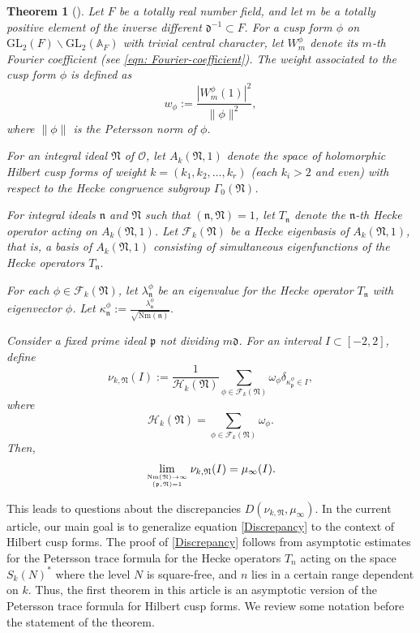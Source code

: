 \documentclass[reqno]{amsart}
\theoremstyle{plain}
\newtheorem*{unmthm}{Theorem}
\theoremstyle{definition}
\theoremstyle{remark}
\def\GL{\mathrm{GL}}
\def\Nr{\mathrm{Nm}}
\def\A{\mathbbm A}
\def\A{\mathbb A}
\begin{document}
\begin{unmthm}[\cite{KL}]
Let $F$ be a totally real number field, and let $m$ be a totally positive element of the inverse different $\mathfrak{d}^{-1}\subset F.$  For a cusp form $\phi $ on $\GL_2(F) \backslash \GL_2({\A}_F)$ with trivial central character, let $W_m^\phi $ denote its $m$-th Fourier coefficient (see \eqref{eqn: Fourier-coefficient}). The weight associated to the cusp form $\phi$ is defined as
$$
w_\phi:=\frac{|W_m^\phi(1)|^2}{\| \phi\|^2},
$$
where $\| \phi\|$ is the Petersson norm of $\phi$.
 
For an integral ideal $\mathfrak{N}$ of $\mathcal{O}$, let $A_k(\mathfrak{N},1)$ denote the space of holomorphic Hilbert cusp forms of weight $ k = (k_1,k_2,\dots,k_r)$ (each $k_i >2$ and even) with respect to the Hecke congruence subgroup $\Gamma_0(\mathfrak{N})$.  

 For integral ideals $\mathfrak{n}$ and $\mathfrak{N}$ such that $(\mathfrak{n},\mathfrak{N}) = 1$, let $T_\mathfrak{n}$ denote the $\mathfrak{n}$-th Hecke operator acting on $A_k(\mathfrak{N},1)$.  Let $\mathcal F_k(\mathfrak{N})$ be a Hecke eigenbasis of $A_k(\mathfrak{N},1)$, that is, a basis of $A_k(\mathfrak{N},1)$ consisting of simultaneous eigenfunctions of the Hecke operators $T_\mathfrak{n}.\,$
 
For each $\phi \in \mathcal F_k(\mathfrak{N})$, let $\lambda^\phi_{\mathfrak{n}}$ be an eigenvalue for the Hecke operator $T_{\mathfrak{n}}$ with eigenvector $\phi$.  Let $\kappa^\phi_{\mathfrak{n}}:=\frac{\lambda^\phi_{\mathfrak{n}}}{\sqrt{\Nr(\mathfrak{n})}}.$
 
Consider a fixed prime ideal $\mathfrak{p}$ not dividing $m\mathfrak{d}$.  For an interval $I \subset [-2,2]$, define
\begin{equation}\label{nu-HF-1}
{\nu}_{k,\mathfrak{N}}(I) := \frac{1}{\mathcal H_k(\mathfrak{N})}\sum_{\phi \in \mathcal F_k(\mathfrak{N})}\omega_{\phi}\delta_{\kappa^\phi_{\mathfrak{p}} \in I},
\end{equation}
where
$$\mathcal H_k(\mathfrak{N}) = \sum_{\phi \in \mathcal F_k(\mathfrak{N})}\omega_{\phi}.$$
Then,
$$
\lim_{\Nr(\mathfrak{N})\rightarrow \infty \atop {(\mathfrak{p}, \mathfrak{N}) = 1}} {\nu}_{k,\mathfrak{N}}(I) = \mu_{\infty}(I).
$$
\end{unmthm}

This leads to questions about the discrepancies $D(\nu_{k,\mathfrak{N}},\mu_{\infty})$.  In the current article,  our main goal is to generalize equation \eqref{Discrepancy} to the context of  Hilbert cusp forms. The proof of  \eqref{Discrepancy} follows from asymptotic estimates for the Petersson trace formula for the Hecke operators $T_n$ acting on the space $S_k(N)^*$ where the level $N$ is square-free, and $n$ lies in a certain range dependent on $k$.  Thus, the first theorem in this article is an asymptotic version of the Petersson trace formula for Hilbert cusp forms.  We review some notation before the statement of the theorem.
\end{document}
